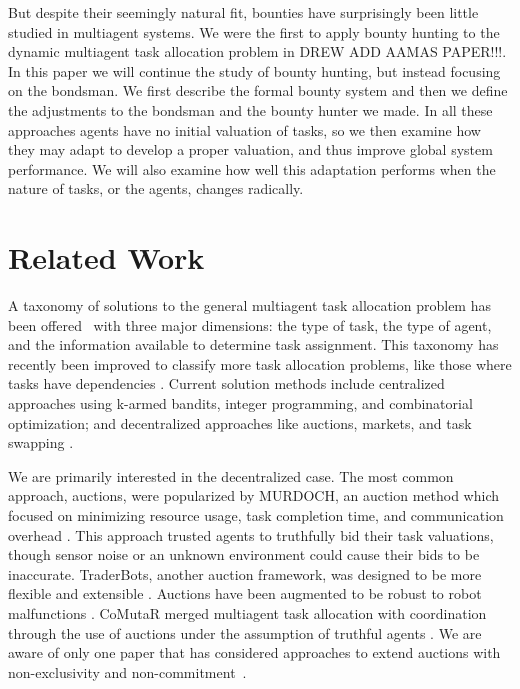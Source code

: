 \documentclass[letterpaper]{aamas2015}
\newcommand\citen[1]{\hbox{\cite{#1}}}
\begin{document}
But despite their seemingly natural fit, bounties have surprisingly been little studied in multiagent systems.  We were the first to apply bounty hunting to the dynamic multiagent task allocation problem in DREW ADD AAMAS PAPER!!!.  In this paper we will continue the study of bounty hunting, but instead focusing on the bondsman.  We first describe the formal bounty system and then we define the adjustments to the bondsman and the bounty hunter we made.  In all these approaches agents have no initial valuation of tasks, so we then examine how they may adapt to develop a proper valuation, and thus improve global system performance.  We will also examine how well this adaptation performs when the nature of tasks, or the agents, changes radically.

\section{Related Work}

A taxonomy of solutions to the general multiagent task allocation problem has been offered~\cite{Gerkey:2004} with three major dimensions: the type of task, the type of agent, and the information available to determine task assignment.  This taxonomy has recently been improved to classify more task allocation problems, like those where tasks have dependencies \citen{Korsah:2013}.  Current solution methods include centralized approaches using k-armed bandits, integer programming, and combinatorial optimization; and decentralized approaches like auctions, markets, and task swapping \citen{Lagoudakis:2004,Liu:2014,Liu:2012,Nanjanath:2006}.


We are primarily interested in the decentralized case.  The most common approach, auctions, were popularized by MURDOCH, an auction method which focused on minimizing resource usage, task completion time, and communication overhead \citen{Gerkey2002c}.  
This approach trusted agents to truthfully bid their task valuations, though sensor noise or an unknown environment could cause their bids to be inaccurate.  TraderBots, another auction framework, was designed to be more flexible and extensible \citen{Dias:2004,Jones:2006}.  Auctions have been augmented to be robust to robot malfunctions \citen{Nanjanath:2010}.  CoMutaR merged  multiagent task allocation with coordination through the use of auctions under the assumption of truthful agents \citen{Shiroma:2009}.  We are aware of only one paper that has considered approaches to extend auctions with non-exclusivity and non-commitment~\cite{Mataric:2003}.
\end{document}

